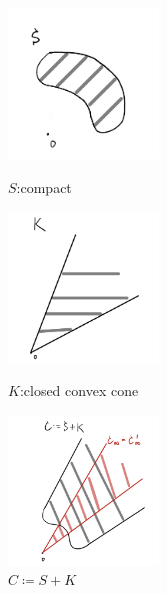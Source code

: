 \documentclass[a4paper,11pt]{jsarticle}
\begin{document}
\begin{figure}[htbp]
  \begin{minipage}{0.3\hsize}
    \begin{center}
      \includegraphics[keepaspectratio, width=40mm]{figures/not_convex_but_asymptotically_regular_1.png}
    \end{center}
    \caption{$S$:compact}
    \label{fig:one}
  \end{minipage}
  \begin{minipage}{0.3\hsize}
    \begin{center}
      \includegraphics[keepaspectratio, width=40mm]{figures/not_convex_but_asymptotically_regular_2.png}
    \end{center}
    \caption{$K$:closed convex cone}
    \label{fig:two}
  \end{minipage}
  \begin{minipage}{0.3\hsize}
    \begin{center}
      \includegraphics[keepaspectratio, width=40mm]{figures/not_convex_but_asymptotically_regular_3.png}
    \end{center}
    \caption{$C \coloneqq S + K$}
    \label{fig:three}
  \end{minipage}
\end{figure}
\end{document}
